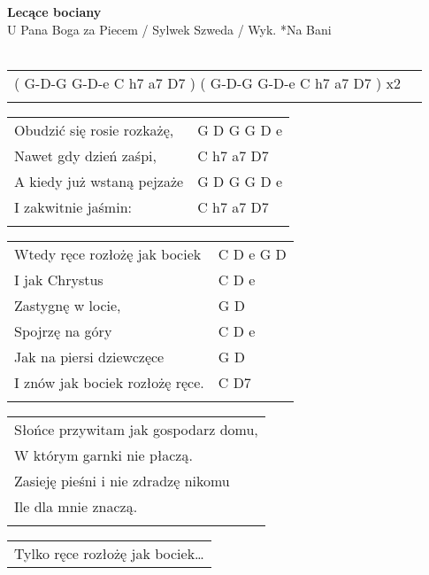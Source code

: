\documentclass[a5paper]{article}
\begin{document}


\noindent
\fontsize{12pt}{15pt}\selectfont
\textbf{Lecące bociany} \\
\fontsize{8pt}{10pt}\selectfont
U Pana Boga za Piecem / Sylwek Szweda / Wyk. *Na Bani \\ \\
\fontsize{10pt}{12pt}\selectfont
{}
\begin{tabular}{@{}p{10.50cm}p{3cm}@{}}
\noindent
( G-D-G G-D-e C h7 a7 D7 ) ( G-D-G G-D-e C h7 a7 D7 ) x2 \\ \\
\end{tabular}  

\noindent
\begin{tabular}{@{}p{7.50cm}p{3cm}@{}}   
Obudzić się rosie rozkażę, & G D G G D e \\
Nawet gdy dzień zaśpi, & C h7 a7 D7 \\
A kiedy już wstaną pejzaże & G D G G D e \\
I zakwitnie jaśmin: & C h7 a7 D7 \\ \\
\end{tabular}

\noindent
\begin{tabular}{@{}p{6.50cm}p{3cm}@{}}
Wtedy ręce rozłożę jak bociek & C D e G D \\
I jak Chrystus & C D e \\
Zastygnę w locie, & G D \\
Spojrzę na góry & C D e \\
Jak na piersi dziewczęce & G D \\
I znów jak bociek rozłożę ręce. & C D7 \\ \\
\end{tabular}

\noindent
\begin{tabular}{@{}p{8.50cm}@{}}
Słońce przywitam jak gospodarz domu, \\
W którym garnki nie płaczą. \\
Zasieję pieśni i nie zdradzę nikomu \\
Ile dla mnie znaczą. \\ \\
\end{tabular}

\noindent
\begin{tabular}{@{}p{7.50cm}@{}}
Tylko ręce rozłożę jak bociek…
\end{tabular}
\end{document}
